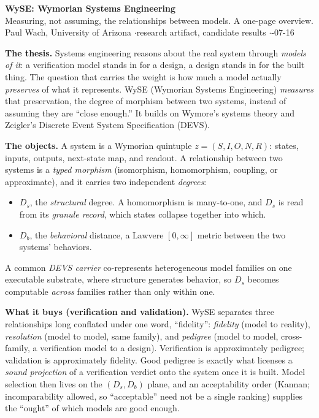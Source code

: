 \documentclass[10pt]{article}
\begin{document}
\begin{center}
{\large\bfseries WySE: Wymorian Systems Engineering}\\[2pt]
{\small Measuring, not assuming, the relationships between models. A one-page overview.}\\[2pt]
{\footnotesize Paul Wach, University of Arizona \quad$\cdot$\quad research artifact, candidate results \quad$\cdot$-07-16}
\end{center}

\textbf{The thesis.} Systems engineering reasons about the real system through \emph{models of it}: a verification model stands in for a design, a design stands in for the built thing. The question that carries the weight is how much a model actually \emph{preserves} of what it represents. WySE (Wymorian Systems Engineering) \emph{measures} that preservation, the degree of morphism between two systems, instead of assuming they are ``close enough.'' It builds on Wymore's systems theory and Zeigler's Discrete Event System Specification (DEVS).

\textbf{The objects.} A system is a Wymorian quintuple $z=(S,I,O,N,R)$: states, inputs, outputs, next-state map, and readout. A relationship between two systems is a \emph{typed morphism} (isomorphism, homomorphism, coupling, or approximate), and it carries two independent \emph{degrees}:
\begin{itemize}
  \item $D_s$, the \emph{structural} degree. A homomorphism is many-to-one, and $D_s$ is read from its \emph{granule record}, which states collapse together into which.
  \item $D_b$, the \emph{behavioral} distance, a Lawvere $[0,\infty]$ metric between the two systems' behaviors.
\end{itemize}
A common \emph{DEVS carrier} co-represents heterogeneous model families on one executable substrate, where structure generates behavior, so $D_s$ becomes computable \emph{across} families rather than only within one.

\textbf{What it buys (verification and validation).} WySE separates three relationships long conflated under one word, ``fidelity'': \emph{fidelity} (model to reality), \emph{resolution} (model to model, same family), and \emph{pedigree} (model to model, cross-family, a verification model to a design). Verification is approximately pedigree; validation is approximately fidelity. Good pedigree is exactly what licenses a \emph{sound projection} of a verification verdict onto the system once it is built. Model selection then lives on the $(D_s, D_b)$ plane, and an acceptability order (Kannan; incomparability allowed, so ``acceptable'' need not be a single ranking) supplies the ``ought'' of which models are good enough.
\end{document}
